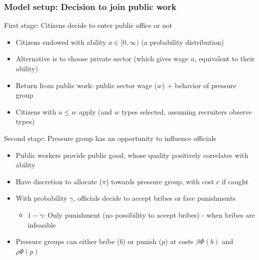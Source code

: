 \documentclass[aspectratio=169]{beamer}
\begin{document}
\begin{frame}
\frametitle{Model setup: Decision to join public work}
First stage: Citizens decide to enter public office or not 
\begin{itemize}\setlength\itemsep{3pt}

\item Citizens endowed with ability $a\in[0,\infty)$ (a probability distribution)
\item Alternative is to choose private sector (which gives wage $a$, equivalent to their ability)
\item Return from public work: public sector wage ($w$) + behavior of pressure group 
\item Citizens with $a\leq w$ apply (and $w$ types selected, assuming recruiters observe types)
\end{itemize} \medskip
Second stage: Pressure group has an opportunity to influence officials
\begin{itemize}\setlength\itemsep{3pt}
\item Public workers provide public good, whose quality positively correlates with ability
\item Have discretion to allocate ($\pi$) towards pressure group, with cost $c$ if caught
\item With probability $\gamma$, officials decide to accept bribes or face punishments
\begin{itemize}
  \item $1-\gamma$: Only punishment (no possibility to accept bribes) - when bribes are infeasible
\end{itemize}
\item Pressure groups can either bribe ($b$) or punish ($p$) at costs $\beta\Phi(b)$ and $\rho\Psi(p)$
\end{itemize}
\end{frame}
\end{document}

